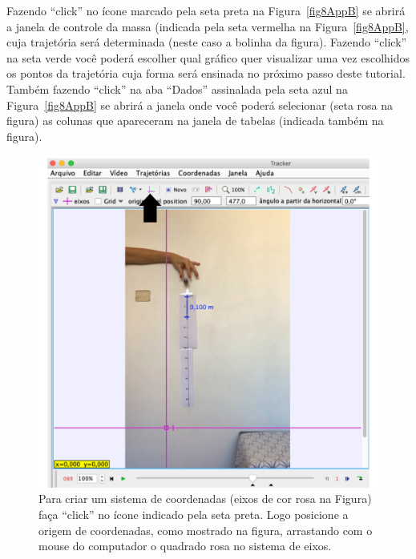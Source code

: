 Fazendo ``click'' no ícone marcado pela seta preta na Figura~\ref{fig8AppB} se abrirá a janela de controle 
 da massa (indicada pela seta vermelha  na Figura~\ref{fig8AppB}, cuja trajetória será determinada (neste caso a bolinha da figura). Fazendo ``click'' na seta verde você poderá escolher qual gráfico 
 quer visualizar uma vez escolhidos os pontos da trajetória cuja forma será ensinada no próximo passo deste tutorial.
Também fazendo ``click'' na aba ``Dados'' assinalada pela seta azul na  Figura~\ref{fig8AppB} se abrirá a janela onde você poderá selecionar (seta rosa na figura) as colunas que apareceram na janela de tabelas (indicada também na figura).
  \begin{minipage}{\linewidth}
      \centering
      \begin{minipage}{0.35\linewidth}
          \begin{figure}[H]
              \includegraphics[width=\linewidth]{Figuras_exp3/fig7AppB.pdf}
\caption{\label{fig7AppB} Para criar um sistema de coordenadas (eixos de cor rosa na Figura) faça ``click'' no ícone indicado pela seta preta. Logo posicione a origem de coordenadas, como mostrado na figura, arrastando com o mouse do computador o quadrado rosa no sistema de eixos.}
          \end{figure}
      \end{minipage}
      \hspace{0.05\linewidth}

\end{minipage}
